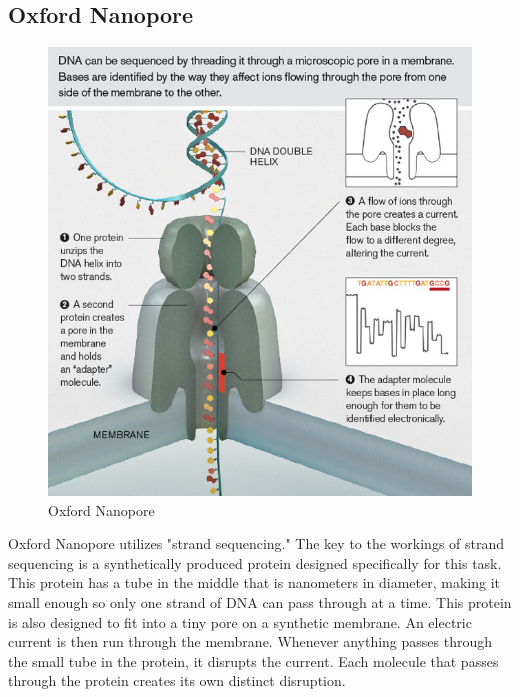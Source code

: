 \documentclass[12pt,letterpaper]{report}
\begin{document}
\subsection{Oxford Nanopore}

\begin{figure}
\vspace{-30pt}
  \begin{center}
    \includegraphics[scale=.5]{oxford_fig.png}
  \end{center}
  \vspace{-20pt}
  \caption[Oxford Nanopore]{Oxford Nanopore \protect\cite{oxfordfigure}}
  \vspace{-10pt}
  \label{fig:oxford}
\end{figure}

Oxford Nanopore utilizes "strand sequencing." The key to the workings of strand sequencing is a synthetically produced protein designed specifically for this task. This protein has a tube in the middle that is nanometers in diameter, making it small enough so only one strand of DNA can pass through at a time. This protein is also designed to fit into a tiny pore on a synthetic membrane. An electric current is then run through the membrane. Whenever anything passes through the small tube in the protein, it disrupts the current. Each molecule that passes through the protein creates its own distinct disruption. 
\end{document}
